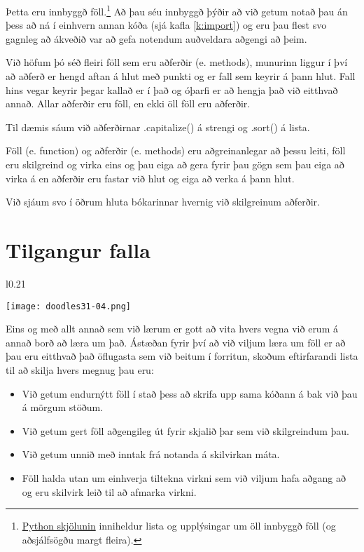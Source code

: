 Þetta eru innbyggð föll.\footnote{\href{https://docs.python.org/3/library/functions.html}{Python skjölunin} inniheldur lista og upplýsingar um öll innbyggð föll (og aðsjálfsögðu margt fleira).}
Að þau séu innbyggð þýðir að við getum notað þau án þess að ná í einhvern annan kóða (sjá kafla \ref{k:import}) og eru þau flest svo gagnleg að ákveðið var að gefa notendum auðveldara aðgengi að þeim.

Við höfum þó séð fleiri föll sem eru aðferðir (e. methods), munurinn liggur í því að aðferð er hengd aftan á hlut með punkti og er fall sem keyrir á þann hlut.
Fall hins vegar keyrir þegar kallað er í það og óþarfi er að hengja það við eitthvað annað.
Allar aðferðir eru föll, en ekki öll föll eru aðferðir.

Til dæmis sáum við aðferðirnar .capitalize() á strengi og .sort() á lista.

Föll (e. function) og aðferðir (e. methods) eru aðgreinanlegar að þessu leiti, föll eru skilgreind og virka eins og þau eiga að gera fyrir þau gögn sem þau eiga að virka á en aðferðir eru fastar við hlut og eiga að verka á þann hlut.

Við sjáum svo í öðrum hluta bókarinnar hvernig við skilgreinum aðferðir.

\section{Tilgangur falla}
 \begin{wrapfigure}{l}{0.21\textwidth} %
	\begin{center}
		\texttt{[image: doodles31-04.png]}
	\end{center}
\end{wrapfigure}
Eins og með allt annað sem við lærum er gott að vita hvers vegna við erum á annað borð að læra um það.
Ástæðan fyrir því að við viljum læra um föll er að þau eru eitthvað það öflugasta sem við beitum í forritun, skoðum eftirfarandi lista til að skilja hvers megnug þau eru:

\begin{itemize}
	\item Við getum endurnýtt föll í stað þess að skrifa upp sama kóðann á bak við þau á mörgum stöðum.
	\item Við getum gert föll aðgengileg út fyrir skjalið þar sem við skilgreindum þau.
	\item Við getum unnið með inntak frá notanda á skilvirkan máta.
	\item Föll halda utan um einhverja tiltekna virkni sem við viljum hafa aðgang að og eru skilvirk leið til að afmarka virkni.
\end{itemize}


